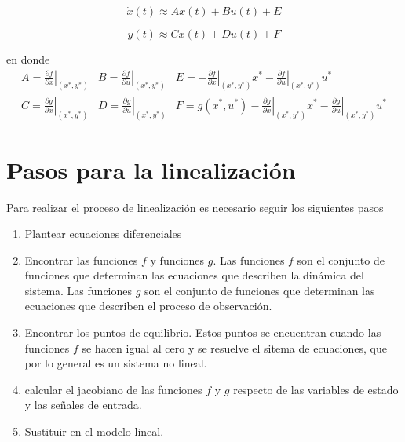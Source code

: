 \documentclass[12pt]{book}
\theoremstyle{definition}
\theoremstyle{remark}
\theoremstyle{plain}
\begin{document}
\begin{equation}
\label{equ103}
\dot{x}(t) \approx  A  x(t) +  B u(t)+ E
\end{equation}

\begin{equation}
\label{equ104}
y (t) \approx  C  x(t) +  D u(t)+ F
\end{equation}

en donde 
\begin{equation}
\label{equ105}
\begin{aligned}
A= \left . \frac{\partial f}{\partial x}  \right | _ {(x^*, y^*)}& B =  \left . \frac{\partial f}{\partial u}  \right |   _ {(x^*, y^*)} & E= - \left . \frac{\partial f}{\partial x}  \right | _ {(x^*, y^*)} x^*-\left . \frac{\partial f}{\partial u}  \right |   _ {(x^*, y^*)} u^*\\
C= \left . \frac{\partial g}{\partial x}  \right | _ {(x^*, y^*)}&  D =  \left . \frac{\partial g}{\partial u}  \right |   _ {(x^*, y^*)} & F=  g(x^*,u^*) -\left . \frac{\partial g}{\partial x}  \right | _ {(x^*, y^*)} x^*-\left . \frac{\partial g}{\partial u}  \right |   _ {(x^*, y^*)} u^*
\end{aligned}
\end{equation}

\section{Pasos para la linealización}

Para realizar el proceso de linealización es necesario seguir los siguientes pasos
\begin{enumerate}
\item Plantear ecuaciones diferenciales
\item Encontrar las funciones $f$ y funciones $g$. Las funciones $f$ son el conjunto de funciones que determinan las ecuaciones que describen la dinámica del sistema. Las funciones $g$ son el conjunto de funciones que determinan las ecuaciones que describen el proceso de observación.
\item Encontrar los puntos de equilibrio. Estos puntos se encuentran cuando las funciones $f$ se hacen igual al cero y se resuelve el sitema de ecuaciones, que por lo general es un sistema no lineal.
\item calcular el jacobiano de las funciones $f$ y $g$ respecto de las variables de estado y las señales de entrada.
\item Sustituir en el modelo lineal. 
\end{enumerate}
\end{document}
